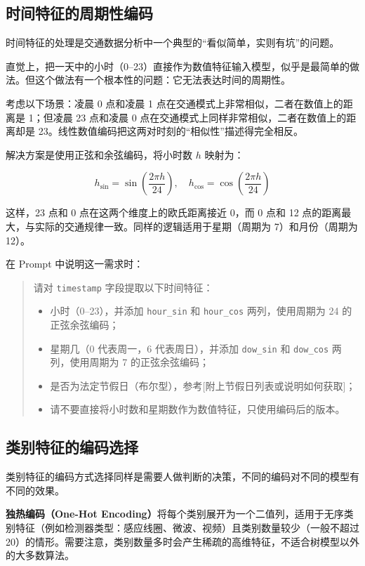 \subsection{时间特征的周期性编码}

时间特征的处理是交通数据分析中一个典型的“看似简单，实则有坑”的问题。

直觉上，把一天中的小时（0--23）直接作为数值特征输入模型，似乎是最简单的做法。但这个做法有一个根本性的问题：它无法表达时间的周期性。

考虑以下场景：凌晨 0 点和凌晨 1 点在交通模式上非常相似，二者在数值上的距离是 1；但凌晨 23 点和凌晨 0 点在交通模式上同样非常相似，二者在数值上的距离却是 23。线性数值编码把这两对时刻的“相似性”描述得完全相反。

解决方案是使用正弦和余弦编码，将小时数 $h$ 映射为：

\[
  h_{\sin} = \sin\!\left(\frac{2\pi h}{24}\right), \quad h_{\cos} = \cos\!\left(\frac{2\pi h}{24}\right)
\]

这样，23 点和 0 点在这两个维度上的欧氏距离接近 0，而 0 点和 12 点的距离最大，与实际的交通规律一致。同样的逻辑适用于星期（周期为 7）和月份（周期为 12）。

在 Prompt 中说明这一需求时：

\begin{quote}
请对 \texttt{timestamp} 字段提取以下时间特征：

\begin{itemize}
  \item 小时（0--23），并添加 \texttt{hour\_sin} 和 \texttt{hour\_cos} 两列，使用周期为 24 的正弦余弦编码；
  \item 星期几（0 代表周一，6 代表周日），并添加 \texttt{dow\_sin} 和 \texttt{dow\_cos} 两列，使用周期为 7 的正弦余弦编码；
  \item 是否为法定节假日（布尔型），参考[附上节假日列表或说明如何获取]；
  \item 请不要直接将小时数和星期数作为数值特征，只使用编码后的版本。
\end{itemize}
\end{quote}

\subsection{类别特征的编码选择}

类别特征的编码方式选择同样是需要人做判断的决策，不同的编码对不同的模型有不同的效果。

\textbf{独热编码（One-Hot Encoding）}将每个类别展开为一个二值列，适用于无序类别特征（例如检测器类型：感应线圈、微波、视频）且类别数量较少（一般不超过 20）的情形。需要注意，类别数量多时会产生稀疏的高维特征，不适合树模型以外的大多数算法。

